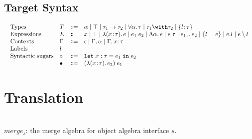 \documentclass[a4paper]{article}
\begin{document}
\subsection{Target Syntax}

\begin{displaymath}
    \begin{array}{l}
      \begin{array}{llrl}
        \text{Types}
        & T & \Coloneqq & \alpha \mid \top \mid \tau_1 \to \tau_2 \mid \for \alpha \tau \mid \tau_1 \andop \tau_2 \mid \recty l \tau \\
        \text{Expressions}
        & E & \Coloneqq & x \mid \top \mid \lam x \tau e \mid \app {e_1} {e_2} \mid \blam \alpha e \mid \tapp e \tau \mid e_1 \mergeop e_2 \mid \reccon l e \mid e.l \mid e \restrictop l\\
        \text{Contexts} & \Gamma & \Coloneqq & \epsilon \mid \Gamma, \alpha \mid \Gamma, x \hast \tau \\
        \text{Labels} & l \\
        \text{Syntactic sugars} & \circ & \Coloneqq & \letexpr {x:\tau} {e_1} {e_2} \\
        & \bullet & \Coloneqq & \app {(\lam x \tau {e_2})} {e_1}
      \end{array}
    \end{array}
\end{displaymath}

\section{Translation}

\begin{mathpar}






    
    
\end{mathpar}

~\\

$merge_s$: the merge algebra for object algebra interface $s$.\\
\end{document}
